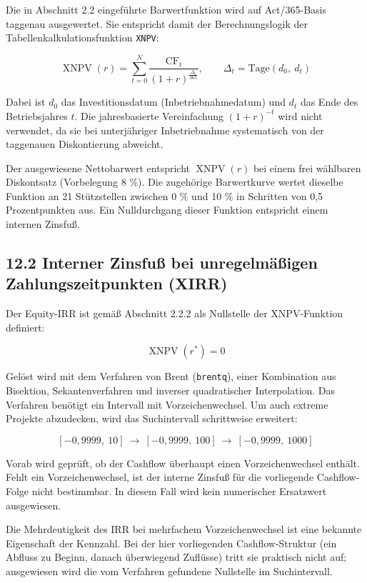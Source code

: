 \documentclass[
  a4paper,
  10pt]{article}
\renewenvironment{quote}
  {\begin{tcolorbox}[
      enhanced,
      breakable,
      colback=Wash,
      colframe=Brand,
      boxrule=0pt,
      leftrule=2.2pt,
      arc=0pt,
      left=8pt,right=8pt,top=6pt,bottom=6pt,
      before skip=8pt,after skip=9pt
    ]\small\color{InkSoft}}
  {\end{tcolorbox}}
\begin{document}
Die in Abschnitt 2.2 eingeführte Barwertfunktion wird auf Act/365-Basis
taggenau ausgewertet. Sie entspricht damit der Berechnungslogik der
Tabellenkalkulationsfunktion \texttt{XNPV}:

\[ \operatorname{XNPV}(r) = \sum_{t=0}^{N} \frac{\mathrm{CF}_t}{(1+r)^{\frac{\Delta_t}{365}}}, \qquad \Delta_t = \text{Tage}(d_0,\ d_t) \]

Dabei ist \(d_0\) das Investitionsdatum (Inbetriebnahmedatum) und
\(d_t\) das Ende des Betriebsjahres \(t\). Die jahresbasierte
Vereinfachung \((1+r)^{-t}\) wird nicht verwendet, da sie bei
unterjähriger Inbetriebnahme systematisch von der taggenauen
Diskontierung abweicht.

Der ausgewiesene Nettobarwert entspricht \(\operatorname{XNPV}(r)\) bei
einem frei wählbaren Diskontsatz (Vorbelegung 8 \%). Die zugehörige
Barwertkurve wertet dieselbe Funktion an 21 Stützstellen zwischen 0 \%
und 10 \% in Schritten von 0,5 Prozentpunkten aus. Ein Nulldurchgang
dieser Funktion entspricht einem internen Zinsfuß.

\hypertarget{interner-zinsfuuxdf-bei-unregelmuxe4uxdfigen-zahlungszeitpunkten-xirr}{%
\subsection{12.2 Interner Zinsfuß bei unregelmäßigen Zahlungszeitpunkten
(XIRR)}\label{interner-zinsfuuxdf-bei-unregelmuxe4uxdfigen-zahlungszeitpunkten-xirr}}

Der Equity-IRR ist gemäß Abschnitt 2.2.2 als Nullstelle der
XNPV-Funktion definiert:

\[ \operatorname{XNPV}(r^{*}) = 0 \]

Gelöst wird mit dem Verfahren von Brent (\texttt{brentq}), einer
Kombination aus Bisektion, Sekantenverfahren und inverser quadratischer
Interpolation. Das Verfahren benötigt ein Intervall mit
Vorzeichenwechsel. Um auch extreme Projekte abzudecken, wird das
Suchintervall schrittweise erweitert:

\[ \left[-0{,}9999,\ 10\right] \ \rightarrow\ \left[-0{,}9999,\ 100\right] \ \rightarrow\ \left[-0{,}9999,\ 1000\right] \]

Vorab wird geprüft, ob der Cashflow überhaupt einen Vorzeichenwechsel
enthält. Fehlt ein Vorzeichenwechsel, ist der interne Zinsfuß für die
vorliegende Cashflow-Folge nicht bestimmbar. In diesem Fall wird kein
numerischer Ersatzwert ausgewiesen.

\begin{quote}
Die Mehrdeutigkeit des IRR bei mehrfachem Vorzeichenwechsel ist eine
bekannte Eigenschaft der Kennzahl. Bei der hier vorliegenden
Cashflow-Struktur (ein Abfluss zu Beginn, danach überwiegend Zuflüsse)
tritt sie praktisch nicht auf; ausgewiesen wird die vom Verfahren
gefundene Nullstelle im Suchintervall.
\end{quote}
\end{document}
